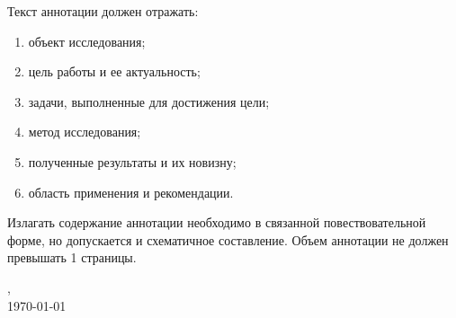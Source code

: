 \begin{par}
Текст аннотации должен отражать:
    \begin{enumerate}
    	\item объект исследования;
    	\item цель работы и ее актуальность;
        \item задачи, выполненные для достижения цели; 
    	\item метод исследования;
    	\item полученные результаты и их новизну;
    	\item область применения и рекомендации.
    \end{enumerate}

Излагать содержание аннотации необходимо в связанной повествовательной форме, но допускается и схематичное составление. Объем аннотации не должен превышать 1 страницы.

\begin{flushleft}
    \vspace{1.02cm}
	\vfill
	\student, \\ %
	\today
\end{flushleft}

\end{par}